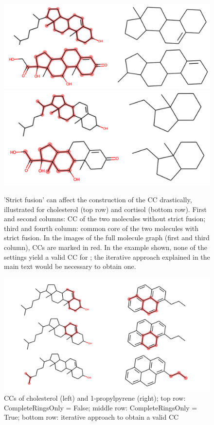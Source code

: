 \begin{figure}
\includegraphics[scale=0.45]{sterols_wo_strictfusion}\includegraphics[scale=0.4]{sterols_w_strictfusion}

\caption{'Strict fusion' can affect the construction of the CC drastically, illustrated for cholesterol (top row) and cortisol (bottom row). First and second columns: CC of the two molecules without strict fusion; third and fourth column: common
core of the two molecules with strict fusion. In the images of the full molecule graph (first and third column), CCs are marked in red. In the example shown, none of the settings yield a valid CC for \trafo; the iterative approach explained in the main text would be necessary to obtain one. }
\label{fig:strictfusion}
\end{figure}




\begin{figure}
	\includegraphics[scale=0.6]{cholesterol_pryenepropanoic_acid.png}
	
	\caption{CCs of cholesterol (left) and 1-propylpyrene (right); top row: CompleteRingsOnly = False; middle row: CompleteRingsOnly = True; bottom row: iterative approach to obtain a valid {\trafo} CC}
	\label{fig:pyrene}
\end{figure}


